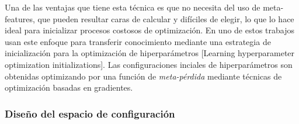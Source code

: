Una de las ventajas que tiene esta técnica es que no necesita del uso de meta-features, que pueden resultar caras de calcular y difíciles de elegir, lo que lo hace ideal para inicializar procesos costosos de optimización. En uno de estos trabajos usan este enfoque para transferir conocimiento mediante una estrategia de inicialización para la optimización de hiperparámetros [Learning hyperparameter optimization initializations]. Las configuraciones inciales de hiperparámetros son obtenidas optimizando por una función de \textit{meta-pérdida} mediante técnicas de optimización basadas en gradientes.


%

\subsubsection{Diseño del espacio de configuración}



